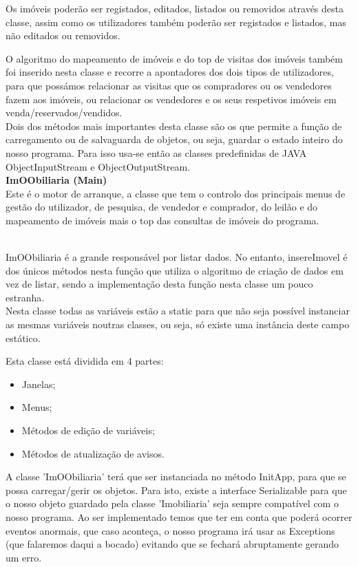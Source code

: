 \documentclass[12pt]{article}
\begin{document}
Os imóveis poderão ser registados, editados, listados ou removidos através desta classe, assim como os utilizadores também poderão ser registados e listados, mas não editados ou removidos.

O algoritmo do mapeamento de imóveis e do top de visitas dos imóveis também foi inserido nesta classe e recorre a apontadores dos dois tipos de utilizadores, para que possámos relacionar as visitas que os compradores ou os vendedores fazem aos imóveis, ou relacionar os vendedores e os seus respetivos imóveis em venda/reservados/vendidos.
~\\

Dois dos métodos mais importantes desta classe são os que permite a função de carregamento ou de salvaguarda de objetos, ou seja, guardar o estado inteiro do nosso programa.
Para isso usa-se então as classes predefinidas de JAVA ObjectInputStream e ObjectOutputStream. 
~\\

\textbf{ImOObiliaria (Main)}
\newline
~\\

Este é o motor de arranque, a classe que tem o controlo dos principais menus de gestão do utilizador, de pesquisa, de vendedor e comprador, do leilão e do mapeamento de imóveis mais o top das consultas de imóveis do programa.

~\\

ImOObiliaria é a grande responsável por listar dados. No entanto, insereImovel é dos únicos métodos nesta função que utiliza o algoritmo de criação de dados em vez de listar, sendo a implementação desta função nesta classe um pouco estranha.
~\\

Nesta classe todas as variáveis estão a static para que não seja possível instanciar as mesmas
variáveis noutras classes, ou seja, só existe uma instância deste campo estático.

Esta classe está dividida em 4 partes:
\newline
\begin{itemize}
\item Janelas;
\item Menus;
\item Métodos de edição de variáveis;
\item Métodos de atualização de avisos.
\end{itemize}

A classe 'ImOObiliaria' terá que ser instanciada no método
InitApp, para que se possa carregar/gerir os objetos.
Para isto, existe a interface Serializable para que o nosso objeto guardado pela classe 'Imobiliaria'
seja sempre compatível com o nosso programa. Ao ser implementado temos que ter em conta
que poderá ocorrer eventos anormais, que caso aconteça, o nosso programa irá usar as Exceptions (que falaremos daqui a bocado)
evitando que se fechará abruptamente gerando um erro. 
~\\
\end{document}
